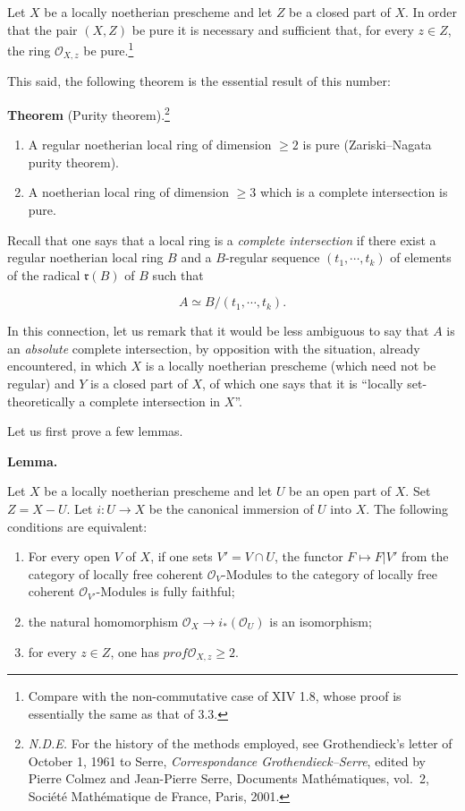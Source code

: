 \documentclass[
  11pt,
  a4paper,
]{book}
\providecommand{\tightlist}{%
  \setlength{\itemsep}{0pt}\setlength{\parskip}{0pt}}
\begin{document}
Let \(X\) be a locally noetherian prescheme and let \(Z\) be a closed
part of \(X\). In order that the pair \((X, Z)\) be pure it is necessary
and sufficient that, for every \(z \in Z\), the ring
\(\mathcal{O}_{X,z}\) be pure.\footnote{Compare with the non-commutative
  case of XIV 1.8, whose proof is essentially the same as that of 3.3.}

This said, the following theorem is the essential result of this number:

\textbf{Theorem} (Purity theorem).\footnote{\emph{N.D.E.} For the
  history of the methods employed, see Grothendieck's letter of October
  1, 1961 to Serre, \emph{Correspondance Grothendieck--Serre}, edited by
  Pierre Colmez and Jean-Pierre Serre, Documents Mathématiques, vol.~2,
  Société Mathématique de France, Paris, 2001.}

\begin{enumerate}
\def\labelenumi{\arabic{enumi}.}
\tightlist
\item
  A regular noetherian local ring of dimension \(\geqslant 2\) is pure
  (Zariski--Nagata purity theorem).
\item
  A noetherian local ring of dimension \(\geqslant 3\) which is a
  complete intersection is pure.
\end{enumerate}

Recall that one says that a local ring is a \emph{complete intersection}
if there exist a regular noetherian local ring \(B\) and a \(B\)-regular
sequence \((t_{1}, \cdots, t_{k})\) of elements of the radical
\(\mathfrak{r}(B)\) of \(B\) such that

\[ A \simeq B/(t_{1}, \cdots, t_{k}). \]

In this connection, let us remark that it would be less ambiguous to say
that \(A\) is an \emph{absolute} complete intersection, by opposition
with the situation, already encountered, in which \(X\) is a locally
noetherian prescheme (which need not be regular) and \(Y\) is a closed
part of \(X\), of which one says that it is ``locally set-theoretically
a complete intersection in \(X\)''.

Let us first prove a few lemmas.

\textbf{Lemma.}

Let \(X\) be a locally noetherian prescheme and let \(U\) be an open
part of \(X\). Set \(Z = X - U\). Let \(i: U \to X\) be the canonical
immersion of \(U\) into \(X\). The following conditions are equivalent:

\begin{enumerate}
\def\labelenumi{\arabic{enumi}.}
\tightlist
\item
  For every open \(V\) of \(X\), if one sets \(V' = V \cap U\), the
  functor \(F \mapsto F|V'\) from the category of locally free coherent
  \(\mathcal{O}_{V}\)-Modules to the category of locally free coherent
  \(\mathcal{O}_{V'}\)-Modules is fully faithful;
\item
  the natural homomorphism
  \(\mathcal{O}_{X} \to i_{*}(\mathcal{O}_{U})\) is an isomorphism;
\item
  for every \(z \in Z\), one has \(prof \mathcal{O}_{X,z} \geqslant 2\).
\end{enumerate}
\end{document}
